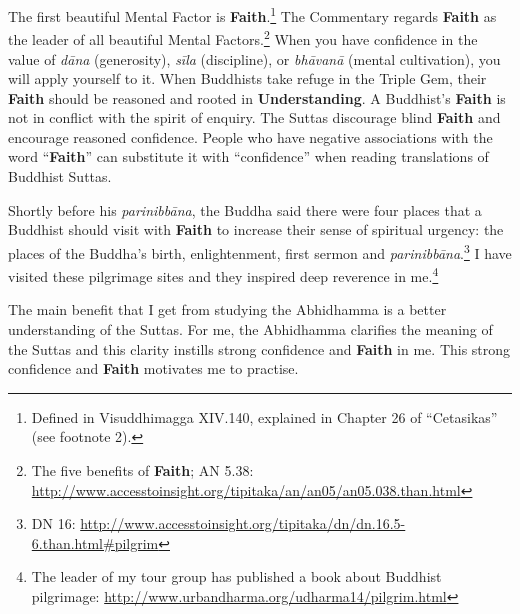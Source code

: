The first beautiful Mental Factor is \textbf{Faith}.\footnote{Defined in Visuddhimagga XIV.140, explained in Chapter 26 of “Cetasikas” (see footnote 2).} The Commentary regards \textbf{Faith} as the leader of all beautiful Mental Factors.\footnote{The five benefits of \textbf{Faith}; AN 5.38: \url{http://www.accesstoinsight.org/tipitaka/an/an05/an05.038.than.html}} When you have confidence in the value of \textit{dāna} (generosity), \textit{sīla} (discipline), or \textit{bhāvanā} (mental cultivation), you will apply yourself to it. When Buddhists take refuge in the Triple Gem, their \textbf{Faith} should be reasoned and rooted in \textbf{Understanding}. A Buddhist’s \textbf{Faith} is not in conflict with the spirit of enquiry. The Suttas discourage blind \textbf{Faith} and encourage reasoned confidence. People who have negative associations with the word “\textbf{Faith}” can substitute it with “confidence” when reading translations of Buddhist Suttas.

Shortly before his \textit{parinibbāna}, the Buddha said there were four places that a Buddhist should visit with \textbf{Faith} to increase their sense of spiritual urgency: the places of the Buddha’s birth, enlightenment, first sermon and \textit{parinibbāna}.\footnote{DN 16: \url{http://www.accesstoinsight.org/tipitaka/dn/dn.16.5-6.than.html\#pilgrim}} I have visited these pilgrimage sites and they inspired deep reverence in me.\footnote{The leader of my tour group has published a book about Buddhist pilgrimage: \url{http://www.urbandharma.org/udharma14/pilgrim.html}}

The main benefit that I get from studying the Abhidhamma is a better understanding of the Suttas. For me, the Abhidhamma clarifies the meaning of the Suttas and this clarity instills strong confidence and \textbf{Faith} in me. This strong confidence and \textbf{Faith} motivates me to \color{blue} practise\color{black}.

